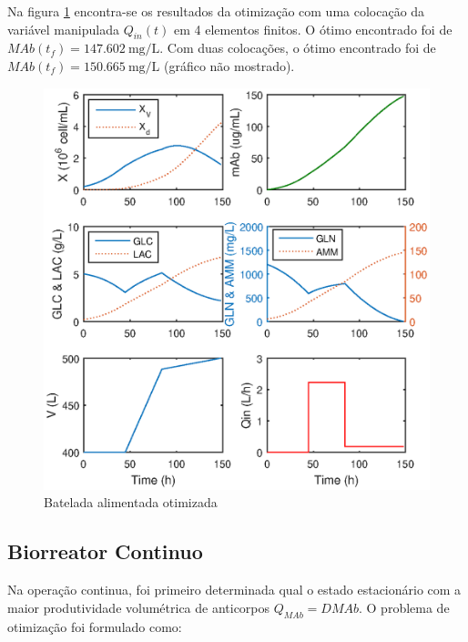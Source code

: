 \documentclass[fleqn,10pt]{SelfArx} %
\begin{document}
Na figura \ref{fig:model2_ncolu1} encontra-se os resultados da otimização com uma colocação da variável manipulada $Q_{in}(t)$ em 4 elementos finitos. O ótimo encontrado foi de $MAb(t_f) = \SI{147,602}{ \mg\per\L}$. Com duas colocações, o ótimo encontrado foi de $MAb(t_f) = \SI{150,665}{ \mg\per\L}$ (gráfico não mostrado). 

\begin{figure}[ht]\centering
	\includegraphics[width=\linewidth]{model2_ncolu1}
	\caption{Batelada alimentada otimizada}
	\label{fig:model2_ncolu1}
\end{figure}

\subsection{Biorreator Continuo}

Na operação continua, foi primeiro determinada qual o estado estacionário com a maior produtividade volumétrica de anticorpos $Q_{MAb} = D MAb$. O problema de otimização foi formulado como:
\end{document}
